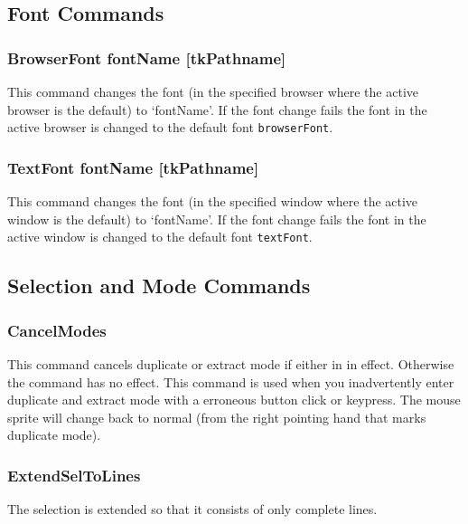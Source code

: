 \subsection{Font Commands}

\subsubsection{BrowserFont fontName [tkPathname]}
This command changes the font
(in the specified browser where the active browser is the default)
to `fontName'.
If the font change fails the font in the active browser
is changed to the default font {\tt browserFont}.

\subsubsection{TextFont fontName [tkPathname]}
This command changes the font
(in the specified window where the active window is the default)
to `fontName'.
If the font change fails the font in the active window
is changed to the default font {\tt textFont}.





\subsection{ Selection and Mode Commands }

\subsubsection{CancelModes}
This command cancels duplicate or extract mode
if either in in effect.
Otherwise the command has no effect.
This command is used when you inadvertently enter
duplicate and extract mode with a erroneous button
click or keypress.
The mouse sprite will change back to normal
(from the right pointing hand that marks duplicate mode).

\subsubsection{ExtendSelToLines}
The selection is extended so that it consists of only complete lines.

